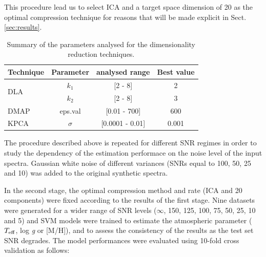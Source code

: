 \documentclass[a4paper,fleqn,usenatbib]{mnras}
\begin{document}
{{{This procedure lead us to select ICA and a target space dimension of
20 as the optimal compression technique for reasons that will be made
explicit in Sect. \ref{sec:results}. 

\begin{table}
\centering
\caption{Summary of the parameters analysed for the 
dimensionality reduction techniques.}
\label{tab:parameters}
\begin{tabular}{l c c c}
\hline
\textbf{Technique} & \textbf{Parameter} & \textbf{analysed range} & \textbf{Best value} \\
\hline
\multirow{2}{*}{DLA} 
	& $k_1$ & [2 - 8]  & 2 \\\cline{2-4}
	& $k_2$ & [2 - 8]  & 3 \\\hline
DMAP & eps.val & [0.01 - 700] & 600 \\\hline
KPCA & $\sigma$ & [0.0001 - 0.01] & 0.001 \\
\hline
\end{tabular}
\end{table}

The procedure described above is repeated for different SNR regimes in
order to study the dependency of the estimation performace on the
noise level of the input spectra. Gaussian white noise of different
variances (SNRs equal to 100, 50, 25 and 10) was added to the original
synthetic spectra. 

In the second stage, the optimal compression method and rate (ICA and
20 components) were fixed according to the results of the first
stage. Nine datasets were generated for a wider range of SNR levels
($\infty$, 150, 125, 100, 75, 50, 25, 10 and 5) and SVM models were
trained to estimate the atmospheric parameter ($T_{\rm eff}$, log
\textit{g} or [M/H]), and to assess the consistency of the results as
the test set SNR degrades. The model performances were evaluated using
10-fold cross validation as follows:

}}}
\end{document}
